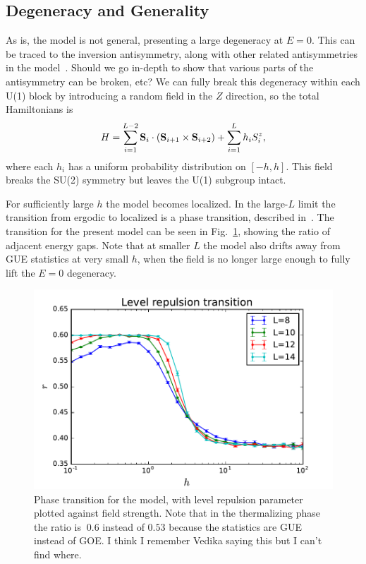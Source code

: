 \documentclass[aps,prx,reprint,superscriptaddress, longbibliography]{revtex4-1}
\newcommand{\charlie}[1]{ {\color{Magenta} {{#1}}}}
\begin{document}
\subsection{Degeneracy and Generality}

As is, the model is not general, presenting a large degeneracy at $E=0$. This can be traced to the inversion antisymmetry, along with other related antisymmetries in the model~\cite{1710.05927}. \charlie{Should we go in-depth to show that various parts of the antisymmetry can be broken, etc?} We can fully break this degeneracy within each U(1) block by introducing a random field in the $Z$ direction, so the total Hamiltonians is
\begin{align}
H = \sum_{i=1}^{L-2}{\bf S}_i\cdot({\bf S}_{i+1}\times {\bf S}_{i+2}) + 
	\sum_{i=1}^{L}h_iS_i^z,
\end{align}
where each $h_i$ has a uniform probability distribution on $[-h,h]$. This field breaks the SU(2) symmetry but leaves the U(1) subgroup intact.

For sufficiently large $h$ the model becomes localized. In the large-$L$ limit the transition from ergodic to localized is a phase transition, described in~\cite{1010.1992v1}. The transition for the present model can be seen in Fig.~\ref{fig:levelrepultrans}, showing the ratio of adjacent energy gaps. Note that at smaller $L$ the model also drifts away from GUE statistics at very small $h$, when the field is no longer large enough to fully lift the $E=0$ degeneracy.

\begin{figure}
	\includegraphics[width=\columnwidth]{levelrepultrans}
	\caption{Phase transition for the model, with level repulsion parameter plotted against field strength. Note that in the thermalizing phase the ratio is $~0.6$ instead of $0.53$ because the statistics are GUE instead of GOE. \charlie{I think I remember Vedika saying this but I can't find where.}}
	\label{fig:levelrepultrans}
\end{figure}
\end{document}
